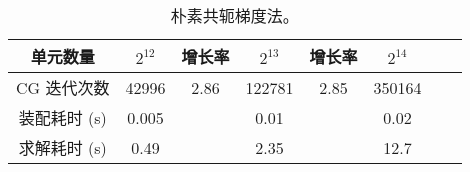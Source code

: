 \documentclass[lang=cn,11pt,a4paper]{elegantpaper}
\begin{document}
\begin{table}[H]
    \centering
    \begin{tabular}{|c|c|c|c|c|c|c|c|}
    \hline
    单元数量                    & $2^{12}$ & 增长率 & $2^{13}$ & 增长率 & $2^{14}$ \\ \hline
    CG 迭代次数            & 42996 & 2.86 & 122781 & 2.85 & 350164\\    
\hline
    装配耗时 (s)           & 0.005          &      & 0.01           &      & 0.02     \\ \hline
    求解耗时 (s)           & 0.49          &      & 2.35           &      & 12.7     \\ \hline
    \end{tabular}
    \caption{\small 朴素共轭梯度法。}
\end{table}

\appendix
\addappheadtotoc
\end{document}
